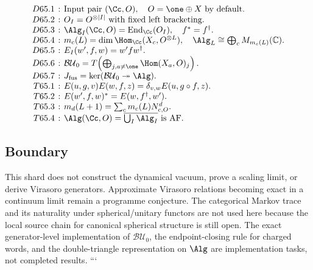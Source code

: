 {\small
\[
\setlength{\arraycolsep}{2pt}
\begin{array}{rcl}
D65.1&:& \text{Input pair }(\Cc,O),\quad O=\one\oplus X\text{ by default}.\\
D65.2&:& O_I=O^{\otimes |I|}\text{ with fixed left bracketing}.\\
D65.3&:& \Alg_I(\Cc,O)=\operatorname{End}_{\Cc}(O_I),\quad f^*=f^\dagger.\\
D65.4&:& m_c(L)=\dim\Hom_{\Cc}(X_c,O^{\otimes L}),\quad
         \Alg_L\cong\bigoplus_c M_{m_c(L)}(\mathbb C).\\
D65.5&:& E_I(w',f,w)=w'f w^\dagger.\\
D65.6&:& \mathcal{BU}_0=T\!\left(\bigoplus_{j,a\neq\one}\Hom(X_a,O)_j\right).\\
D65.7&:& J_{\mathrm{fus}}=\ker(\mathcal{BU}_0\twoheadrightarrow\Alg).\\
T65.1&:& E(u,g,v)E(w,f,z)=\delta_{v,w}E(u,g\circ f,z).\\
T65.2&:& E(w',f,w)^*=E(w,f^\dagger,w').\\
T65.3&:& m_d(L+1)=\sum_c m_c(L)N_{c,O}^d.\\
T65.4&:& \Alg(\Cc,O)=\overline{\bigcup_I\Alg_I}\text{ is AF.}
\end{array}
\]
}

\subsection{Boundary}

This shard does not construct the dynamical vacuum, prove a scaling limit, or
derive Virasoro generators.  Approximate Virasoro relations becoming exact in a
continuum limit remain a programme conjecture.  The categorical Markov trace
and its naturality under spherical/unitary functors are not used here because
the local source chain for canonical spherical structure is still open.  The
exact generator-level implementation of \(\mathcal{BU}_0\), the endpoint-closing
rule for charged words, and the double-triangle representation on \(\Alg\) are
implementation tasks, not completed results.
```
